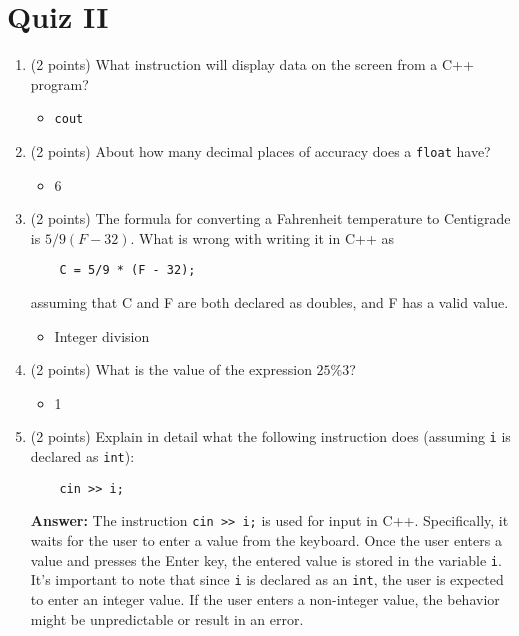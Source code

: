 \documentclass{report}
\begin{document}
    \pagebreak \bigbreak \noindent 
    \section{\LARGE Quiz II}
    \bigbreak \noindent 
    \begin{enumerate}
    \item (2 points) What instruction will display data on the screen from a C++ program?
    \begin{itemize}
        \item \texttt{cout}
    \end{itemize}
    
    \item (2 points) About how many decimal places of accuracy does a \texttt{float} have?
    \begin{itemize}
        \item 6
    \end{itemize}
    
    \item (2 points) The formula for converting a Fahrenheit temperature to Centigrade is \(5/9(F - 32)\). What is wrong with writing it in C++ as
    \begin{verbatim}
    C = 5/9 * (F - 32);
    \end{verbatim}
    assuming that C and F are both declared as doubles, and F has a valid value.
    \begin{itemize}
        \item Integer division
    \end{itemize}
    
    \item (2 points) What is the value of the expression \(25 \% 3\)?
    \begin{itemize}
        \item 1
    \end{itemize}
    
    \item (2 points) Explain in detail what the following instruction does (assuming \texttt{i} is declared as \texttt{int}):
    \begin{verbatim}
    cin >> i;
    \end{verbatim}
    \bigbreak \noindent 
    \textbf{Answer:} The instruction \texttt{cin >> i;} is used for input in C++. Specifically, it waits for the user to enter a value from the keyboard. Once the user enters a value and presses the Enter key, the entered value is stored in the variable \texttt{i}. It's important to note that since \texttt{i} is declared as an \texttt{int}, the user is expected to enter an integer value. If the user enters a non-integer value, the behavior might be unpredictable or result in an error.


\end{enumerate}
\end{document}
